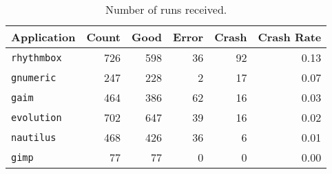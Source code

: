 \documentclass[times,10pt,twocolumn]{article}
\newcommand{\evolution}{\tt evolution}
\newcommand{\gaim}{\tt gaim}
\newcommand{\gimp}{\tt gimp}
\newcommand{\gnumeric}{\tt gnumeric}
\newcommand{\nautilus}{\tt nautilus}
\newcommand{\rhythmbox}{\tt rhythmbox}
\begin{document}
\begin{table}
  \centering
  \begin{tabular}{lrrrrr}
    Application & Count & Good & Error & Crash & Crash Rate \\ \hline
    \rhythmbox & 726 & 598 & 36 & 92 & 0.13 \\
    \gnumeric & 247 & 228 & 2 & 17 & 0.07 \\
    \gaim & 464 & 386 & 62 & 16 & 0.03 \\
    \evolution & 702 & 647 & 39 & 16 & 0.02 \\
    \nautilus & 468 & 426 & 36 & 6 & 0.01 \\
    \gimp & 77 & 77 & 0 & 0 & 0.00
  \end{tabular}
  \caption{Number of runs received.}  
  \label{reports-per-app}
\end{table}


\end{document}

